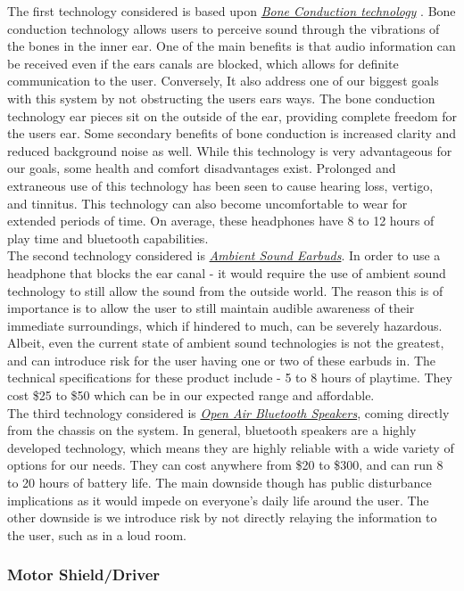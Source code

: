 \noindent The first technology considered is based upon \underline{\textit{Bone Conduction technology}} \cite{BoneConductionRef}. Bone conduction technology allows users to perceive sound through the vibrations of the bones in the inner ear. One of the main benefits is that audio information can be received even if the ears canals are blocked, which allows for definite communication to the user. Conversely, It also address one of our biggest goals with this system by not obstructing the users ears ways. The bone conduction technology ear pieces sit on the outside of the ear, providing complete freedom for the users ear. Some secondary benefits of bone conduction is increased clarity and reduced background noise as well. While this technology is very advantageous for our goals, some health and comfort disadvantages exist. Prolonged and extraneous use of this technology has been seen to cause hearing loss, vertigo, and tinnitus. This technology can also become uncomfortable to wear for extended periods of time. On average, these headphones have 8 to 12 hours of play time and bluetooth capabilities.  \\

\noindent The second technology considered is \underline{\textit{Ambient Sound Earbuds}}. In order to use a headphone that blocks the ear canal - it would require the use of ambient sound technology to still allow the sound from the outside world. The reason this is of importance is to allow the user to still maintain audible awareness of their immediate surroundings, which if hindered to much, can be severely hazardous. Albeit, even the current state of ambient sound technologies is not the greatest, and can introduce risk for the user having one or two of these earbuds in. The technical  specifications for these product include - 5 to 8 hours of playtime. They cost \$25 to \$50 which can be in our expected range and affordable. \\

\noindent The third technology considered is \underline{\textit{Open Air Bluetooth Speakers}}, coming directly from the chassis on the system. In general, bluetooth speakers are a highly developed technology, which means they are highly reliable with a wide variety of options for our needs. They can cost anywhere from \$20 to \$300, and can run 8 to 20 hours of battery life. The main downside though has public disturbance implications as it would impede on everyone's daily life around the user. The other downside is we introduce risk by not directly relaying the information to the user, such as in a loud room. \\

\subsubsection{Motor Shield/Driver}
